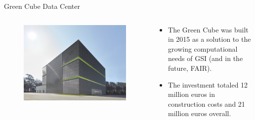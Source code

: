 \begin{frame}{Green Cube Data Center}
    \begin{columns}
        \begin{column}{0.5\textwidth}
            \begin{figure}
                \centering
                \includegraphics[width=\textwidth]{images/gsi_green_cube.jpg}
            \end{figure}
        \end{column}
        \begin{column}{0.5\textwidth}
            \begin{itemize}
                \item The Green Cube was built in 2015 as a solution to the growing computational needs of GSI (and in the future, FAIR).
                \item The investment totaled \num{12} million euros in construction costs and \num{21} million euros overall.
            \end{itemize}
        \end{column}
    \end{columns}
\end{frame}

